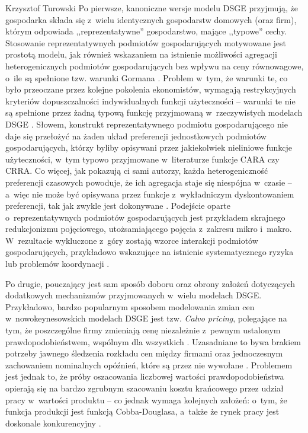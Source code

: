 \begin{artplenv}{Krzysztof Turowski}
Po pierwsze, kanoniczne wersje modelu DSGE przyjmują, że gospodarka składa się z~wielu identycznych gospodarstw domowych
(oraz firm), którym odpowiada ,,reprezentatywne'' gospodarstwo, mające ,,typowe'' cechy. Stosowanie reprezentatywnych
podmiotów gospodarujących motywowane jest prostotą modelu, jak również wskazaniem na istnienie możliwości agregacji heterogenicznych
podmiotów gospodarujących bez wpływu na ceny równowagowe, o~ile są spełnione tzw. warunki Gormana
\parencite{eichenbaum_estimating_1990}.
Problem w~tym, że warunki te, co było przeoczane przez kolejne pokolenia ekonomistów, wymagają
restrykcyjnych kryteriów dopuszczalności indywidualnych funkcji użyteczności  --  warunki te nie są
spełnione przez żadną typową funkcję przyjmowaną w~rzeczywistych modelach DSGE
\parencite{jackson_non-existence_2017}.
Słowem, konstrukt reprezentatywnego podmiotu gospodarującego nie daje się przełożyć na żaden układ preferencji jednostkowych
podmiotów gospodarujących, którzy byliby opisywani przez jakiekolwiek nieliniowe funkcje użyteczności, w~tym typowo
przyjmowane w~literaturze funkcje CARA czy CRRA. Co więcej, jak pokazują ci sami autorzy, każda heterogeniczność preferencji
czasowych powoduje, że ich agregacja staje się niespójna w~czasie  --  a~więc nie może być opisywana przez
funkcje z~wykładniczym dyskontowaniem preferencji, tak jak zwykle jest dokonywane
\parencite{jackson_collective_2015}.
Podejście oparte o~reprezentatywnych podmiotów gospodarujących jest przykładem skrajnego redukcjonizmu pojęciowego,
utożsamiającego pojęcia z~zakresu mikro i~makro. W~rezultacie wykluczone z~góry zostają wzorce interakcji podmiotów gospodarujących,
przykładowo wskazujące na istnienie systematycznego ryzyka lub problemów koordynacji
\parencite{colander_financial_2009}.

Po drugie, pouczający jest sam sposób doboru oraz obrony założeń dotyczących dodatkowych mechanizmów przyjmowanych w~wielu
modelach DSGE. Przykładowo, bardzo popularnym sposobem modelowania zmian cen w~nowokeynesowskich modelach DSGE jest
tzw. \textit{Calvo pricing}, polegające na tym, że poszczególne firmy zmieniają cenę niezależnie z~pewnym ustalonym
prawdopodobieństwem, wspólnym dla wszystkich
\parencite{calvo_staggered_1983}.
Uzasadniane to bywa brakiem
potrzeby jawnego śledzenia rozkładu cen między firmami oraz jednoczesnym zachowaniem nominalnych opóźnień, które są
przez nie wywołane
\parencite{christiano_nominal_2005}.
Problemem jest jednak to, że próby oszacowania
liczbowej wartości prawdopodobieństwa opierają się na bardzo zgrubnym szacowaniu kosztu krańcowego przez udział
pracy w~wartości produktu  --  co jednak wymaga kolejnych założeń: o~tym, że funkcja produkcji jest funkcją
Cobba-Douglasa, a~także że rynek pracy jest doskonale konkurencyjny
\parencite{wolman_sticky_1999}.


\end{artplenv}
